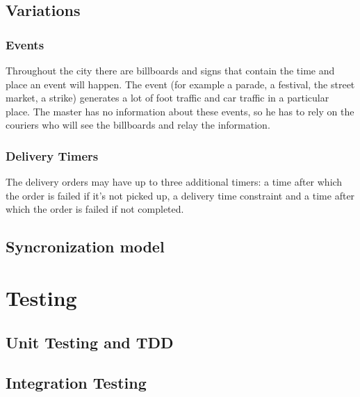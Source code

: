 \documentclass{article}
\begin{document}
\subsection{Variations}
\subsubsection{Events}
Throughout the city there are billboards and signs that contain the time and place an event will happen. The event (for example a parade, a festival, the street market, a strike) generates a lot of foot traffic and car traffic in a particular place. The master has no information about these events, so he has to rely on the couriers who will see the billboards and relay the information.
\subsubsection{Delivery Timers}
The delivery orders may have up to three additional timers: a time after which the order is failed if it's not picked up, a delivery time constraint and a time after which the order is failed if not completed.
\subsection{Syncronization model}

\clearpage

\section{Testing}
\subsection{Unit Testing and TDD}
\subsection{Integration Testing}
\end{document}
